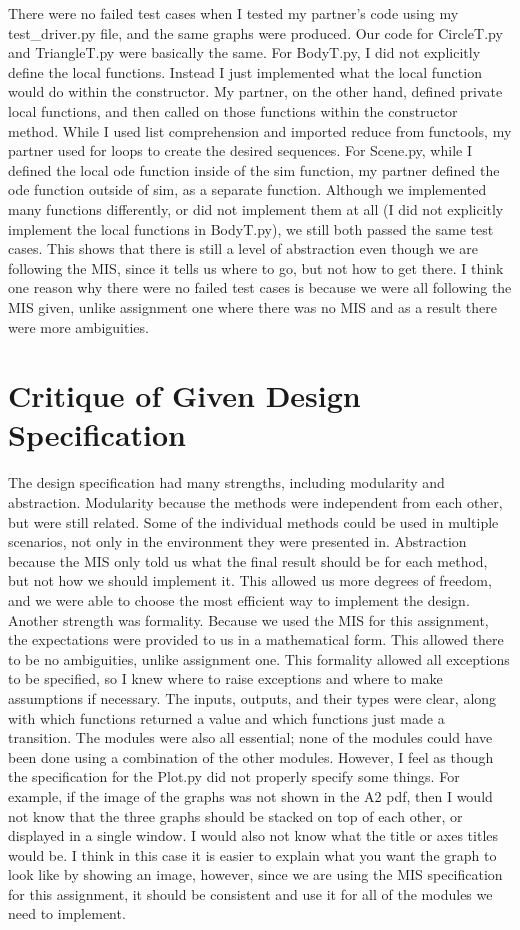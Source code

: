 \documentclass[12pt]{article}
\begin{document}
There were no failed test cases when I tested my partner’s code using my test\_driver.py
file, and the same graphs were produced. Our code for CircleT.py and TriangleT.py were basically the same. For BodyT.py, I did not explicitly define the local functions. Instead I just implemented what the local function would do within the constructor. My partner, on the other hand, defined private local functions, and then called on those functions within the constructor method. While I used list comprehension and imported reduce from functools, my partner used for loops to create the desired sequences. For Scene.py, while I defined the local ode function inside of the sim function, my partner defined the ode function outside of sim, as a separate function. Although we implemented many functions differently, or did not implement them at all (I did not explicitly implement the local functions in BodyT.py), we still both passed the same test cases. This shows that there is still a level of abstraction even though we are following the MIS, since it tells us where to go, but not how to get there. I think one reason why there were no failed test cases is because we were all following the MIS given, unlike assignment one where there was no MIS and as a result there were more ambiguities.

\section{Critique of Given Design Specification}

The design specification had many strengths, including modularity and abstraction. Modularity because the methods were independent from each other, but were still related. Some of the individual methods could be used in multiple scenarios, not only in the environment they were presented in. Abstraction because the MIS only told us what the final result should be for each method, but not how we should implement it. This allowed us more
degrees of freedom, and we were able to choose the most efficient way to implement the design. Another strength was formality. Because we used the MIS for this assignment, the expectations were provided to us in a mathematical form. This allowed there to be no ambiguities, unlike assignment one. This formality allowed all exceptions to be specified, so I knew where to raise exceptions and where to make assumptions if necessary. The inputs, outputs, and their types were clear, along with which functions returned a value and which functions just made a transition. The modules were also all essential; none of the modules could have been done using a combination of the other modules. However, I feel as though the specification for the Plot.py did not properly specify some things. For example, if the image of the graphs was not shown in the A2 pdf, then I would not know that the three graphs should be stacked on top of each other, or displayed in a single window. I would also not know what the title or axes titles would be. I think in this case it is easier to explain what you want the graph to look like by showing an image, however, since we are using the MIS specification for this assignment, it should be consistent and use it for all of the modules we need to implement.
\end{document}
